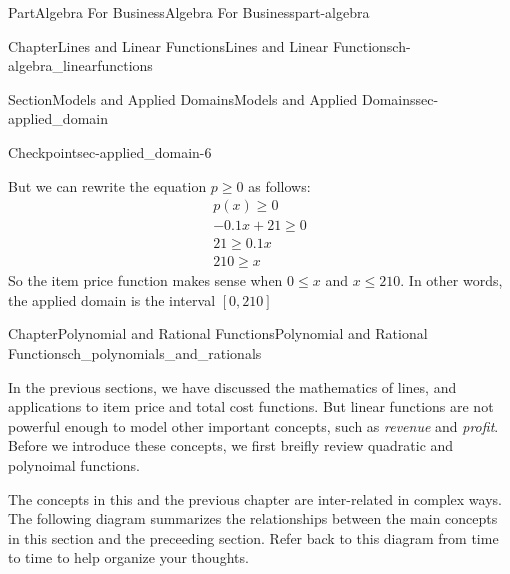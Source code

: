 \documentclass[oneside,10pt,]{tufte-book}
\numberwithin{equation}{chapter}
\begin{document}
\begin{partptx}{Part}{Algebra For Business}{}{Algebra For Business}{}{}{part-algebra}
\begin{chapterptx}{Chapter}{Lines and Linear Functions}{}{Lines and Linear Functions}{}{}{ch-algebra_linearfunctions}
\begin{sectionptx}{Section}{Models and Applied Domains}{}{Models and Applied Domains}{}{}{sec-applied_domain}
\begin{inlineexercise}{Checkpoint}{}{sec-applied_domain-6}
\par
But we can rewrite the equation \(p\geq 0\) as follows:%
\begin{gather*}
p(x) \geq 0 \\
-0.1x + 21 \geq 0\\
21 \geq 0.1x\\
210 \geq x
\end{gather*}
So the item price function makes sense when \(0\leq x\) and \(x\leq 210\).  In other words, the applied domain is the interval \([0,210]\)%
\end{inlineexercise}%
\end{sectionptx}
\end{chapterptx}
%
\typeout{************************************************}
\typeout{************************************************}
%
\begin{chapterptx}{Chapter}{Polynomial and Rational Functions}{}{Polynomial and Rational Functions}{}{}{ch_polynomials_and_rationals}
\renewcommand*{\chaptername}{Chapter}
\begin{introduction}{}%
In the previous sections, we have discussed the mathematics of lines, and applications to item price and total cost functions. But linear functions are not powerful enough to model other important concepts, such as \emph{revenue} and \emph{profit}. Before we introduce these concepts, we first breifly review quadratic and polynoimal functions.%
\par
The concepts in this and the previous chapter are inter-related in complex ways.  The following diagram summarizes the relationships between the main concepts in this section and the preceeding section.  Refer back to this diagram from time to time to help organize your thoughts.%
\begin{image}{0}{1}{0}{}%
\end{image}
\end{introduction}
\end{chapterptx}
\end{partptx}
\end{document}
